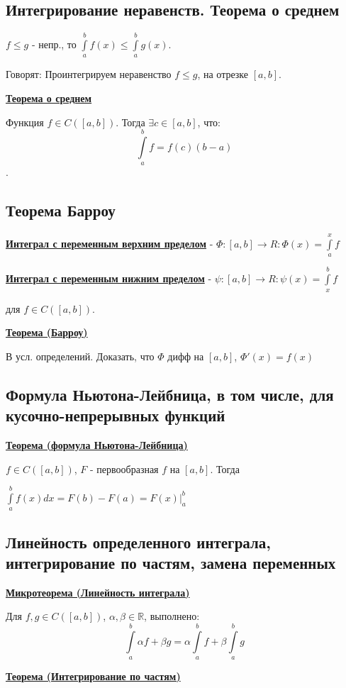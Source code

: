 \documentclass{article}
\newcommand{\dint}{\displaystyle \int}
\newcommand{\integral}[2]{\displaystyle\int\limits_{#1}^{#2}}
\newcommand{\deff}[1]{\underline{\textbf{#1}}}
\newcommand{\thmm}[1]{\underline{\textbf{#1}}}
\begin{document}
\subsection{Интегрирование неравенств. Теорема о среднем}

$f\leq g$ - непр., то $\dint\limits_{a}^b f(x)\leq \dint\limits_{a}^b g(x)$. 

Говорят: Проинтегрируем неравенство $f\leq g$, на отрезке $[a,b]$.

\thmm{Теорема о среднем}

    Функция $f \in C([a,b])$. Тогда $\exists c \in [a,b]$, что:
    $$\integral{a}{b}f = f(c)(b-a)$$.

\subsection{Теорема Барроу}

\deff{Интеграл с переменным верхним пределом} -  $\Phi:[a,b] \rightarrow R: \Phi(x)= \integral{a}{x}f$

\deff{Интеграл с переменным нижним пределом} -  $\psi:[a,b] \rightarrow R: \psi(x)= \integral{x}{b}f$

для $f\in C([a,b])$.

\thmm{Теорема (Барроу)}

В усл. определений. Доказать, что $\Phi$ дифф на $[a,b]$, $\Phi'(x)=f(x)$

\subsection{Формула Ньютона-Лейбница, в том числе, для кусочно-непрерывных функций}

\thmm{Теорема (формула Ньютона-Лейбница)}

$f\in C([a,b])$, $F$ - первообразная $f$ на $[a,b]$. Тогда

$\integral{a}{b}f(x)dx = F(b)-F(a) = F(x)\big|^b_a$

\subsection{Линейность определенного интеграла, интегрирование по частям, замена переменных}

 \thmm{Микротеорема (Линейность интеграла)}

 Для $f,g \in C([a,b])$, $\alpha,\beta \in \mathbb{R}$, выполнено:
$$\integral{a}{b}\alpha f+ \beta g = \alpha \integral{a}{b}f + \beta\integral{a}{b}g$$

 \thmm{Теорема (Интегрирование по частям)}
\end{document}
